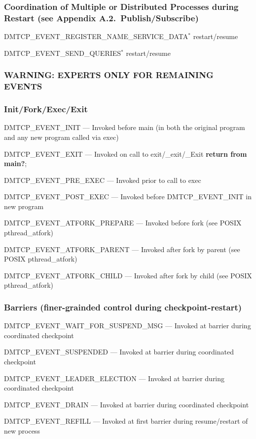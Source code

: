 \documentclass{article}
\begin{document}
\subsubsection*{Coordination of Multiple or Distributed Processes during Restart
	(see Appendix A.2.~Publish/Subscribe)}
\begin{list}{}{\leftmargin=3em \itemindent=-2em}
\item
  DMTCP\_EVENT\_REGISTER\_NAME\_SERVICE\_DATA$^*$ restart/resume
\item
  DMTCP\_EVENT\_SEND\_QUERIES$^*$ restart/resume
\end{list}

\subsubsection*{WARNING:  EXPERTS ONLY FOR REMAINING EVENTS}
\subsubsection*{Init/Fork/Exec/Exit}
\begin{list}{}{\leftmargin=3em \itemindent=-2em}
\item
  DMTCP\_EVENT\_INIT --- Invoked before main (in both the original program
and any new program called via exec)
\item
  DMTCP\_EVENT\_EXIT --- Invoked on call to exit/\_exit/\_Exit {\bf return from main?};
\item
  DMTCP\_EVENT\_PRE\_EXEC --- Invoked prior to call to exec
\item
  DMTCP\_EVENT\_POST\_EXEC --- Invoked before DMTCP\_EVENT\_INIT in new program
\item
  DMTCP\_EVENT\_ATFORK\_PREPARE --- Invoked before fork (see POSIX pthread\_atfork)
\item
  DMTCP\_EVENT\_ATFORK\_PARENT --- Invoked after fork by parent (see POSIX
    pthread\_atfork)
\item
  DMTCP\_EVENT\_ATFORK\_CHILD --- Invoked after fork by child (see POSIX
    pthread\_atfork) \\
\end{list}

\subsubsection*{Barriers (finer-grainded control during checkpoint-restart)}
\begin{list}{}{\leftmargin=3em \itemindent=-2em}
\item
  DMTCP\_EVENT\_WAIT\_FOR\_SUSPEND\_MSG --- Invoked at barrier during
coordinated checkpoint
\item
  DMTCP\_EVENT\_SUSPENDED --- Invoked at barrier during coordinated checkpoint
\item
  DMTCP\_EVENT\_LEADER\_ELECTION --- Invoked at barrier during coordinated checkpoint
\item
  DMTCP\_EVENT\_DRAIN --- Invoked at barrier during coordinated checkpoint
\item
  DMTCP\_EVENT\_REFILL --- Invoked at first barrier during resume/restart of new process
\end{list}
\end{document}
